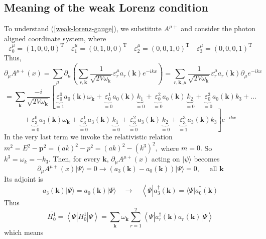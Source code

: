 \subsection{Meaning of the weak Lorenz condition}
To understand (\ref{weak-lorenz-gauge}), we substitute $A^{\mu+}$ and consider the photon aligned coordinate system, where
$$
\varepsilon_{0}^{\mu}=(1,0,0,0)^{\mathrm{T}} \quad \varepsilon_{1}^{\mu}=(0,1,0,0)^{\mathrm{T}} \quad \varepsilon_{2}^{\mu}=(0,0,1,0)^{\mathrm{T}} \quad \varepsilon_{3}^{\mu}=(0,0,0,1)^{\mathrm{T}}
$$
Thus,
$$
\partial_{\mu} A^{\mu+}(x)=\sum_{\mu} \partial_{\mu}\left(\sum_{r, \mathbf{k}} \frac{1}{\sqrt{2 V \omega_{\mathrm{k}}}} \varepsilon_{r}^{\mu} a_{r}(\mathbf{k}) e^{-i k x}\right)=\sum_{r, \mathbf{k}, \mu} \frac{1}{\sqrt{2 V \omega_{\mathrm{k}}}} \varepsilon_{r}^{\mu} a_{r}(\mathbf{k}) \partial_{\mu} e^{-i k x}
$$
$$
=\sum_{\mathbf{k}} \frac{-i}{\sqrt{2 V \omega_{\mathbf{k}}}}\left[\underbrace{\varepsilon_{0}^{0}}_{=1} a_{0}(\mathbf{k}) \omega_{\mathbf{k}}+\underbrace{\varepsilon_{0}^{1}}_{=0}a_{0}(\mathbf{k}) \underbrace{k_{1}}_{=0}+\underbrace{\varepsilon_{0}^{2}}_{=0}a_{0}(\mathbf{k})\underbrace{k_{2}}_{=0}+\underbrace{\varepsilon_{0}^{3}}_{=0}a_{0}(\mathbf{k}) k_{3}+\dots\right.
$$
$$
\left.+\underbrace{\varepsilon_{3}^{0}}_{=0} a_{3}(\mathbf{k}) \omega_{\mathbf{k}}+\underbrace{\varepsilon_{3}^{1}}_{=0}a_{3}(\mathbf{k})\underbrace{k_1}_{=0}+\underbrace{\varepsilon_{3}^{2}}_{=0}a_{3}(\mathbf{k}) \underbrace{k_{2}}_{=0}+\underbrace{\varepsilon_{3}^{3}}_{=1}a_{3}(\mathbf{k})k_3\right]e^{-ikx}
$$
In the very last term we invoke the relativistic relation $m^{2}=E^{2}-\mathbf{p}^{2}=(a k)^{2}-p^{2}=(a k)^{2}-\left(k^{3}\right)^{2},$ where $m=0 .$ So $k^{3}=\omega_{k}=-k_{3} .$ Then, for every $\mathbf{k}$, $\partial_{\mu} A^{\mu+}(x)$ acting on $|\psi\rangle$ becomes
\begin{equation}
\partial_{\mu} A^{\mu+}(x)|\Psi\rangle= 0 \rightarrow\left(a_{3}(\mathbf{k})-a_{0}(\mathbf{k})\right)|\Psi\rangle= 0, \quad \text { all } \mathbf{k}
\end{equation}
Its adjoint is
\begin{equation}
a_{3}(\mathbf{k})|\Psi\rangle= a_{0}(\mathbf{k})|\Psi\rangle \quad \rightarrow \quad\left\langle\Psi\left|a_{3}^{\dagger}(\mathbf{k})=\langle\Psi| a_{0}^{\dagger}(\mathbf{k})\right.\right.
\end{equation}
Thus
\begin{equation}
\bar{H_{0}^{1}}=\left\langle\Psi\left|H_{0}^{1}\right| \Psi\right\rangle=\sum_{\mathbf{k}} \omega_{\mathbf{k}} \sum_{r=1}^{2}\left\langle\Psi\left|a_{r}^{\dagger}(\mathbf{k}) a_{r}(\mathbf{k})\right| \Psi\right\rangle
\end{equation}
which means 

